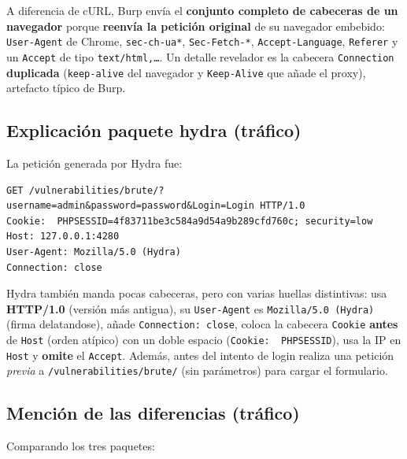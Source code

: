 \documentclass[letter,12pt]{article}
\begin{document}
A diferencia de cURL, Burp envía el \textbf{conjunto completo de cabeceras de un navegador} porque \textbf{reenvía la petición original} de su navegador embebido: \texttt{User-Agent} de Chrome, \texttt{sec-ch-ua*}, \texttt{Sec-Fetch-*}, \texttt{Accept-Language}, \texttt{Referer} y un \texttt{Accept} de tipo \texttt{text/html,\ldots}. Un detalle revelador es la cabecera \texttt{Connection} \textbf{duplicada} (\texttt{keep-alive} del navegador y \texttt{Keep-Alive} que añade el proxy), artefacto típico de Burp. \\


\subsection{Explicación paquete hydra (tráfico)}
La petición generada por Hydra fue:

\begin{verbatim}
GET /vulnerabilities/brute/?username=admin&password=password&Login=Login HTTP/1.0
Cookie:  PHPSESSID=4f83711be3c584a9d54a9b289cfd760c; security=low
Host: 127.0.0.1:4280
User-Agent: Mozilla/5.0 (Hydra)
Connection: close
\end{verbatim}

Hydra también manda pocas cabeceras, pero con varias huellas distintivas: usa \textbf{HTTP/1.0} (versión más antigua), su \texttt{User-Agent} es \texttt{Mozilla/5.0 (Hydra)} (firma delatandose), añade \texttt{Connection: close}, coloca la cabecera \texttt{Cookie} \textbf{antes} de \texttt{Host} (orden atípico) con un doble espacio (\texttt{Cookie:\ \ PHPSESSID}), usa la IP en \texttt{Host} y \textbf{omite} el \texttt{Accept}. Además, antes del intento de login realiza una petición \emph{previa} a \texttt{/vulnerabilities/brute/} (sin parámetros) para cargar el formulario. \\


\subsection{Mención de las diferencias (tráfico)}
Comparando los tres paquetes:
\end{document}
